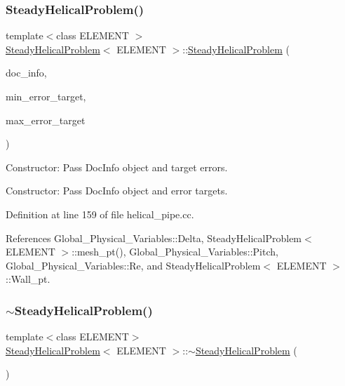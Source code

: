 \subsubsection{\texorpdfstring{Steady\+Helical\+Problem()}{SteadyHelicalProblem()}}
{\footnotesize\ttfamily template$<$class E\+L\+E\+M\+E\+NT $>$ \\
\hyperlink{classSteadyHelicalProblem}{Steady\+Helical\+Problem}$<$ E\+L\+E\+M\+E\+NT $>$\+::\hyperlink{classSteadyHelicalProblem}{Steady\+Helical\+Problem} (\begin{DoxyParamCaption}\item[{Doc\+Info \&}]{doc\+\_\+info,  }\item[{const double \&}]{min\+\_\+error\+\_\+target,  }\item[{const double \&}]{max\+\_\+error\+\_\+target }\end{DoxyParamCaption})}



Constructor\+: Pass Doc\+Info object and target errors. 

Constructor\+: Pass Doc\+Info object and error targets. 

Definition at line 159 of file helical\+\_\+pipe.\+cc.



References Global\+\_\+\+Physical\+\_\+\+Variables\+::\+Delta, Steady\+Helical\+Problem$<$ E\+L\+E\+M\+E\+N\+T $>$\+::mesh\+\_\+pt(), Global\+\_\+\+Physical\+\_\+\+Variables\+::\+Pitch, Global\+\_\+\+Physical\+\_\+\+Variables\+::\+Re, and Steady\+Helical\+Problem$<$ E\+L\+E\+M\+E\+N\+T $>$\+::\+Wall\+\_\+pt.

\mbox{\label{classSteadyHelicalProblem_adf88db88e0aef324db9a910126cac298}} 
\subsubsection{\texorpdfstring{$\sim$\+Steady\+Helical\+Problem()}{~SteadyHelicalProblem()}}
{\footnotesize\ttfamily template$<$class E\+L\+E\+M\+E\+NT$>$ \\
\hyperlink{classSteadyHelicalProblem}{Steady\+Helical\+Problem}$<$ E\+L\+E\+M\+E\+NT $>$\+::$\sim$\hyperlink{classSteadyHelicalProblem}{Steady\+Helical\+Problem} (\begin{DoxyParamCaption}{ }\end{DoxyParamCaption})\hspace{0.3cm}{\ttfamily [inline]}}



